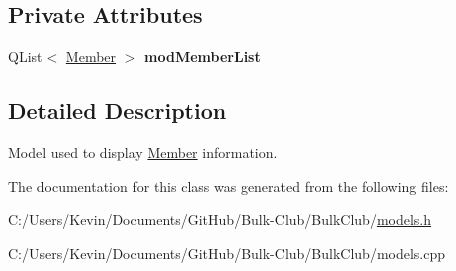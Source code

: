 \subsection*{Private Attributes}
\begin{DoxyCompactItemize}
\item 
\mbox{\label{class_member_model_ab6036ba08b309eac114c11712c98f948}} 
Q\+List$<$ \mbox{\hyperlink{class_member}{Member}} $>$ {\bfseries mod\+Member\+List}
\end{DoxyCompactItemize}


\subsection{Detailed Description}
Model used to display \mbox{\hyperlink{class_member}{Member}} information. 

The documentation for this class was generated from the following files\+:\begin{DoxyCompactItemize}
\item 
C\+:/\+Users/\+Kevin/\+Documents/\+Git\+Hub/\+Bulk-\/\+Club/\+Bulk\+Club/\mbox{\hyperlink{models_8h}{models.\+h}}\item 
C\+:/\+Users/\+Kevin/\+Documents/\+Git\+Hub/\+Bulk-\/\+Club/\+Bulk\+Club/models.\+cpp\end{DoxyCompactItemize}
